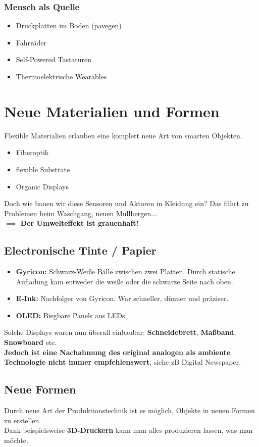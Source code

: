 \documentclass[a4paper]{article}
\begin{document}
\subsubsection{Mensch als Quelle}
\begin{itemize}
	\item Druckplatten im Boden (pavegen)
	\item Fahrräder
	\item Self-Powered Tastaturen
	\item Thermoelektrische Wearables
\end{itemize}

\newpage
\section{Neue Materialien und Formen}
Flexible Materialien erlauben eine komplett neue Art von smarten Objekten.
\begin{itemize}
	\item Fiberoptik
	\item flexible Substrate
	\item Organic Displays
\end{itemize}
Doch wie bauen wir diese Sensoren und Aktoren in Kleidung ein? Das führt zu Problemen beim Waschgang, neuen Müllbergen... \\
$\implies$ \textbf{Der Umwelteffekt ist grauenhaft!}
\subsection{Electronische Tinte / Papier}
\begin{itemize}
	\item \textbf{Gyricon:} Schwarz-Weiße Bälle zwischen zwei Platten. Durch statische Aufladung kam entweder die weiße oder die schwarze Seite nach oben.
	\item \textbf{E-Ink:} Nachfolger von Gyricon. War schneller, dünner und präziser.
	\item \textbf{OLED:} Biegbare Panels aus LEDs
\end{itemize}
Solche Displays waren nun überall einbaubar: \textbf{Schneidebrett}, \textbf{Maßband}, \textbf{Snowboard} etc.\\
\textbf{ Jedoch ist eine Nachahmung des original analogen als ambiente Technologie nicht immer empfehlenswert}, siehe zB Digital Newspaper.

\subsection{Neue Formen}
Durch neue Art der Produktionstechnik ist es möglich, Objekte in neuen Formen zu erstellen.\\
Dank beispielsweise \textbf{3D-Druckern} kann man alles produzieren lassen, was man möchte.\\
\end{document}
